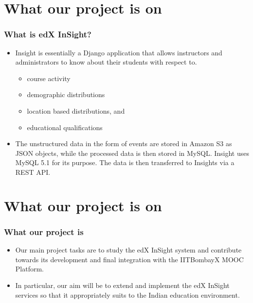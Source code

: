 \documentclass[12pt,xcolor=dvipsnames]{beamer}
\begin{document}
\section{What our project is on}
\begin{frame}[t]
\frametitle{What is edX InSight?}

\begin{itemize}

\item Insight is essentially a Django application that allows instructors and administrators to know about
their students with respect to.

\begin{itemize}
\item course activity
\item demographic distributions
\item location based distributions, and 
\item educational qualifications
\end{itemize}

\item The unstructured data in the form of events
are stored in Amazon S3 as JSON objects, while the processed data is then stored in MySQL. Insight
uses MySQL 5.1 for its purpose. The data is then transferred to Insights via a REST API.

\end{itemize}
\end{frame}

\section{What our project is on}
\begin{frame}[t]
\frametitle{What our project is}

\begin{itemize}

\item Our main project tasks are to study the edX InSight system and contribute towards its development and final integration
with the IITBombayX MOOC Platform.

\item In particular, our aim will be to extend and implement the edX InSight services so that it appropriately suits to the 
Indian education environment.

\end{itemize}
\end{frame}
\end{document}
